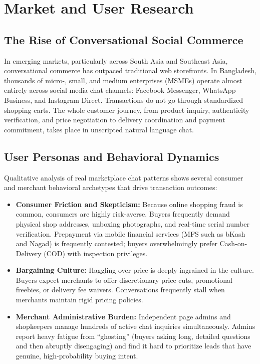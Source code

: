 \section{Market and User Research}
\label{sec:market}

\subsection{The Rise of Conversational Social Commerce}
In emerging markets, particularly across South Asia and Southeast Asia, conversational commerce has outpaced traditional web storefronts. In Bangladesh, thousands of micro-, small, and medium enterprises (MSMEs) operate almost entirely across social media chat channels: Facebook Messenger, WhatsApp Business, and Instagram Direct. Transactions do not go through standardized shopping carts. The whole customer journey, from product inquiry, authenticity verification, and price negotiation to delivery coordination and payment commitment, takes place in unscripted natural language chat.

\subsection{User Personas and Behavioral Dynamics}
Qualitative analysis of real marketplace chat patterns shows several consumer and merchant behavioral archetypes that drive transaction outcomes:
\begin{itemize}
  \item \textbf{Consumer Friction and Skepticism:} Because online shopping fraud is common, consumers are highly risk-averse. Buyers frequently demand physical shop addresses, unboxing photographs, and real-time serial number verification. Prepayment via mobile financial services (MFS such as bKash and Nagad) is frequently contested; buyers overwhelmingly prefer Cash-on-Delivery (COD) with inspection privileges.
  \item \textbf{Bargaining Culture:} Haggling over price is deeply ingrained in the culture. Buyers expect merchants to offer discretionary price cuts, promotional freebies, or delivery fee waivers. Conversations frequently stall when merchants maintain rigid pricing policies.
  \item \textbf{Merchant Administrative Burden:} Independent page admins and shopkeepers manage hundreds of active chat inquiries simultaneously. Admins report heavy fatigue from ``ghosting'' (buyers asking long, detailed questions and then abruptly disengaging) and find it hard to prioritize leads that have genuine, high-probability buying intent.
\end{itemize}

